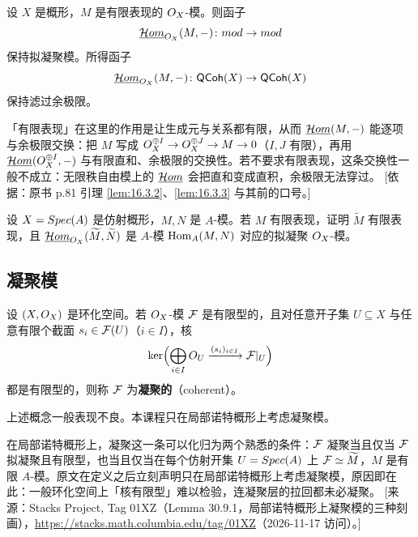 \begin{lemma}\label{lem:16.3.3}
设 $X$ 是概形，$M$ 是有限表现的 $O_X$-模。则函子
\[
\underline{\mathcal{H}om}_{O_X}(M,-)\colon mod\to mod
\]
保持拟凝聚模。所得函子
\[
\underline{\mathcal{H}om}_{O_X}(M,-)\colon\mathsf{QCoh}(X)\to\mathsf{QCoh}(X)
\]
保持滤过余极限。
\end{lemma}

\begin{yizhu}
「有限表现」在这里的作用是让生成元与关系都有限，从而 $\underline{\mathcal{H}om}(M,-)$ 能逐项与余极限交换：把 $M$ 写成 $O_X^{\oplus I}\to O_X^{\oplus J}\to M\to 0$（$I,J$ 有限），再用 $\underline{\mathcal{H}om}(O_X^{\oplus I},-)$ 与有限直和、余极限的交换性。若不要求有限表现，这条交换性一般不成立：无限秩自由模上的 $\underline{\mathcal{H}om}$ 会把直和变成直积，余极限无法穿过。
[依据：原书 p.81 引理 \ref{lem:16.3.2}、\ref{lem:16.3.3} 与其前的口号。]
\end{yizhu}

\begin{exercise}\label{exc:16.3.4}
设 $X=Spec(A)$ 是仿射概形，$M,N$ 是 $A$-模。若 $M$ 有限表现，证明 $\widetilde{M}$ 有限表现，且 $\underline{\mathcal{H}om}_{O_X}(\widetilde{M},\widetilde{N})$ 是 $A$-模 $\operatorname{Hom}_A(M,N)$ 对应的拟凝聚 $O_X$-模。
\end{exercise}

\subsection{凝聚模}\label{sec:16.4}

\begin{definition}\label{def:16.4.1}
设 $(X,O_X)$ 是环化空间。若 $O_X$-模 $\mathcal{F}$ 是有限型的，且对任意开子集 $U\subseteq X$ 与任意有限个截面 $s_i\in\mathcal{F}(U)$（$i\in I$），核
\[
\ker\Bigl(\bigoplus_{i\in I}O_U\xrightarrow{(s_i)_{i\in I}}\mathcal{F}|_U\Bigr)
\]
都是有限型的，则称 $\mathcal{F}$ 为\textbf{凝聚的}（coherent）。
\end{definition}

上述概念一般表现不良。本课程只在局部诺特概形上考虑凝聚模。

\begin{yizhu}
在局部诺特概形上，凝聚这一条可以化归为两个熟悉的条件：$\mathcal{F}$ 凝聚当且仅当 $\mathcal{F}$ 拟凝聚且有限型，也当且仅当在每个仿射开集 $U=Spec(A)$ 上 $\mathcal{F}\simeq\widetilde{M}$，$M$ 是有限 $A$-模。原文在定义之后立刻声明只在局部诺特概形上考虑凝聚模，原因即在此：一般环化空间上「核有限型」难以检验，连凝聚层的拉回都未必凝聚。
[来源：Stacks Project, Tag 01XZ（Lemma 30.9.1，局部诺特概形上凝聚模的三种刻画），\url{https://stacks.math.columbia.edu/tag/01XZ}（2026-11-17 访问）。]
\end{yizhu}
